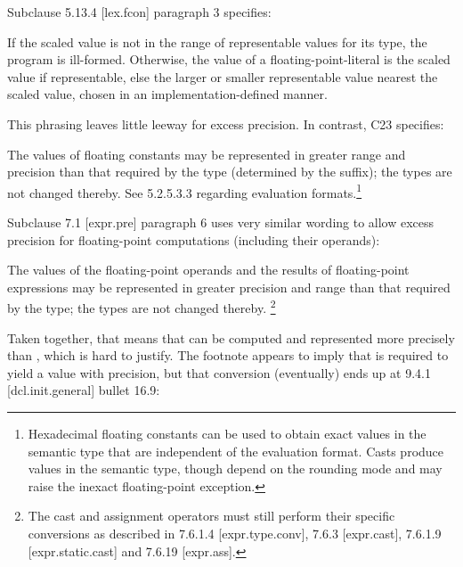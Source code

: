 Subclause 5.13.4 [lex.fcon] paragraph 3 specifies:

\begin{wgText}
  \setcounter{Paras}{2}\pnum
  If the scaled value is not in the range of representable values for its type,
  the program is ill-formed. Otherwise, the value of a floating-point-literal
  is the scaled value if representable, else the larger or smaller
  representable value nearest the scaled value, chosen in an
  implementation-defined manner.
\end{wgText}

This phrasing leaves little leeway for excess precision.
In contrast, C23 specifies:

\begin{wgText}
  \setcounter{Paras}{5}\pnum
  The values of floating constants may be represented in greater range and
  precision than that required by the type (determined by the suffix); the
  types are not changed thereby. See 5.2.5.3.3 regarding evaluation
  formats.\footnote{Hexadecimal floating constants can be used to obtain exact
    values in the semantic type that are independent of the evaluation format.
    Casts produce values in the semantic type, though depend on the rounding
    mode and may raise the inexact floating-point exception.}
\end{wgText}

Subclause 7.1 [expr.pre] paragraph 6 uses very similar wording to allow excess
precision for floating-point computations (including their operands):

\begin{wgText}
  \setcounter{Paras}{5}\pnum
  The values of the floating-point operands and the results of floating-point
  expressions may be represented in greater precision and range than that
  required by the type; the types are not changed thereby.%
  \footnote{The cast and assignment operators must still perform their specific
    conversions as described in 7.6.1.4 [expr.type.conv], 7.6.3 [expr.cast],
    7.6.1.9 [expr.static.cast] and 7.6.19 [expr.ass].}
\end{wgText}

Taken together, that means that  can be computed and
represented more precisely than , which is hard to justify.
The footnote appears to imply that  is required to yield a
value with \float precision, but that conversion (eventually) ends up at 9.4.1
[dcl.init.general] bullet 16.9:

